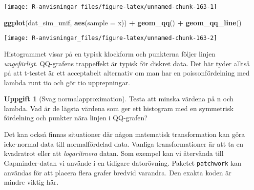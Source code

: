 \documentclass[
]{book}
\newenvironment{Shaded}{\begin{snugshade}}{\end{snugshade}}
\newcommand{\AttributeTok}[1]{\textcolor[rgb]{0.13,0.29,0.53}{#1}}
\newcommand{\FunctionTok}[1]{\textcolor[rgb]{0.13,0.29,0.53}{\textbf{#1}}}
\newcommand{\NormalTok}[1]{#1}
\newcommand{\SpecialCharTok}[1]{\textcolor[rgb]{0.81,0.36,0.00}{\textbf{#1}}}
\theoremstyle{definition}
\theoremstyle{definition}
\theoremstyle{definition}
\newtheorem{exercise}{Uppgift}[chapter]
\theoremstyle{definition}
\theoremstyle{remark}
\begin{document}
\begin{center}\texttt{[image: R-anvisningar\_files/figure-latex/unnamed-chunk-163-1]} \end{center}

\begin{Shaded}
\begin{Highlighting}[]
\FunctionTok{ggplot}\NormalTok{(dat\_sim\_unif, }\FunctionTok{aes}\NormalTok{(}\AttributeTok{sample =}\NormalTok{ x)) }\SpecialCharTok{+} \FunctionTok{geom\_qq}\NormalTok{() }\SpecialCharTok{+} \FunctionTok{geom\_qq\_line}\NormalTok{()}
\end{Highlighting}
\end{Shaded}

\begin{center}\texttt{[image: R-anvisningar\_files/figure-latex/unnamed-chunk-163-2]} \end{center}

Histogrammet visar på en typisk klockform och punkterna följer linjen \emph{ungefärligt}. QQ-grafens trappeffekt är typisk för diskret data. Det här tyder alltså på att t-testet är ett acceptabelt alternativ om man har en poissonfördelning med lambda runt tio och gör tio upprepningar.

\begin{exercise}[Svag normalapproximation]
Testa att minska värdena på n och lambda. Vad är de lägsta värdena som ger ett histogram med en symmetrisk fördelning och punkter nära linjen i QQ-grafen?
\end{exercise}

Det kan också finnas situationer där någon matematisk transformation kan göra icke-normal data till normalfördelad data. Vanliga transformationer är att ta en kvadratrot eller att \emph{logaritmera} datan. Som exempel kan vi återvända till Gapminder-datan vi använde i en tidigare datorövning. Paketet \texttt{patchwork} kan användas för att placera flera grafer bredvid varandra. Den exakta koden är mindre viktig här.
\end{document}
